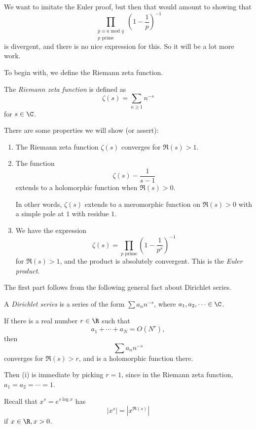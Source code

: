 \documentclass[a4paper]{article}
\begin{document}
We want to imitate the Euler proof, but then that would amount to showing that
\[
  \prod_{\substack{p \equiv a \text{ mod } q\\ p\text{ prime}}} \left(1 - \frac{1}{p}\right)^{-1}
\]
is divergent, and there is no nice expression for this. So it will be a lot more work.

To begin with, we define the Riemann zeta function.
\begin{defi}\index{$\zeta$}
  The \emph{Riemann zeta function} is defined as
  \[
    \zeta(s) = \sum_{n \geq 1}n^{-s}
  \]
  for $s \in \C$.
\end{defi}

There are some properties we will show (or assert):
\begin{prop}\leavevmode
  \begin{enumerate}
    \item The Riemann zeta function $\zeta(s)$ converges for $\Re(s) > 1$.
    \item The function
      \[
        \zeta(s) - \frac{1}{s - 1}
      \]
      extends to a holomorphic function when $\Re(s) > 0$.

      In other words, $\zeta(s)$ extends to a meromorphic function on $\Re(s) > 0$ with a simple pole at $1$ with residue $1$.
    \item We have the expression
      \[
        \zeta(s) = \prod_{p\text{ prime}} \left(1 - \frac{1}{p^s}\right)^{-1}
      \]
      for $\Re(s) > 1$, and the product is absolutely convergent. This is the \emph{Euler product}.
  \end{enumerate}
\end{prop}

The first part follows from the following general fact about Dirichlet series.
\begin{defi}
  A \emph{Dirichlet series} is a series of the form $\sum a_n n^{-s}$, where $a_1, a_2, \cdots\in \C$.
\end{defi}

\begin{lemma}
  If there is a real number $r \in \R$ such that
  \[
    a_1 + \cdots + a_N = O(N^r),
  \]
  then
  \[
    \sum a_n n^{-s}
  \]
  converges for $\Re(s) > r$, and is a holomorphic function there.
\end{lemma}
Then (i) is immediate by picking $r = 1$, since in the Riemann zeta function, $a_1 = a_2 = \cdots = 1$.

Recall that $x^s = e^{s \log x}$ has
\[
  |x^s| = |x^{\Re(s)}|
\]
if $x \in \R, x > 0$.
\end{document}
